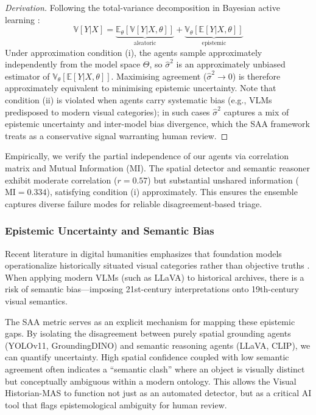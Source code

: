 \documentclass[12pt,onecolumn,a4paper]{IEEEtran}
\begin{document}
\begin{proof}[Derivation]
Following the total-variance decomposition in Bayesian active learning \cite{gal2016dropout}:
\begin{equation}
\mathbb{V}[Y|X] = \underbrace{\mathbb{E}_{\theta}[\mathbb{V}[Y|X, \theta]]}_{\text{aleatoric}} + \underbrace{\mathbb{V}_{\theta}[\mathbb{E}[Y|X, \theta]]}_{\text{epistemic}}
\end{equation}
Under approximation condition (i), the agents sample approximately independently from the model space $\Theta$, so $\hat{\sigma}^2$ is an approximately unbiased estimator of $\mathbb{V}_{\theta}[\mathbb{E}[Y|X,\theta]]$. Maximising agreement ($\hat{\sigma}^2 \to 0$) is therefore approximately equivalent to minimising epistemic uncertainty. Note that condition (ii) is violated when agents carry systematic bias (e.g., VLMs predisposed to modern visual categories); in such cases $\hat{\sigma}^2$ captures a mix of epistemic uncertainty and inter-model bias divergence, which the SAA framework treats as a conservative signal warranting human review.
\end{proof}

Empirically, we verify the partial independence of our agents via correlation matrix and Mutual Information (MI). The spatial detector and semantic reasoner exhibit moderate correlation ($r=0.57$) but substantial unshared information ($\text{MI}=0.334$), satisfying condition (i) approximately. This ensures the ensemble captures diverse failure modes for reliable disagreement-based triage.

\subsubsection{Epistemic Uncertainty and Semantic Bias}
Recent literature in digital humanities emphasizes that foundation models operationalize historically situated visual categories rather than objective truths \cite{impett_offert_2022_dah}. When applying modern VLMs (such as LLaVA) to historical archives, there is a risk of semantic bias---imposing 21st-century interpretations onto 19th-century visual semantics. 

The SAA metric serves as an explicit mechanism for mapping these epistemic gaps. By isolating the disagreement between purely spatial grounding agents (YOLOv11, GroundingDINO) and semantic reasoning agents (LLaVA, CLIP), we can quantify uncertainty. High spatial confidence coupled with low semantic agreement often indicates a ``semantic clash'' where an object is visually distinct but conceptually ambiguous within a modern ontology. This allows the Visual Historian-MAS to function not just as an automated detector, but as a critical AI tool that flags epistemological ambiguity for human review.
\end{document}
